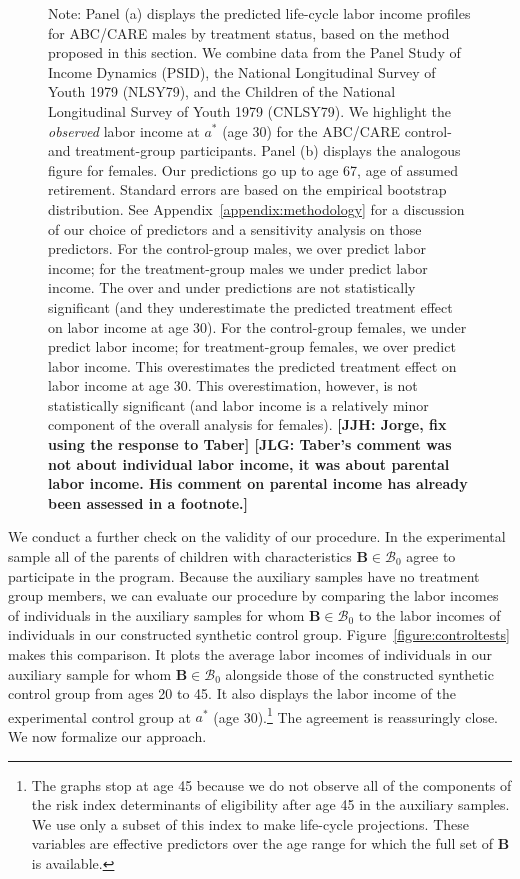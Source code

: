 \begin{figure}
Note: Panel (a) displays the predicted life-cycle labor income profiles for ABC/CARE males by treatment status, based on the method proposed in this section. We combine data from the Panel Study of Income Dynamics (PSID), the National Longitudinal Survey of Youth 1979 (NLSY79), and the Children of the National Longitudinal Survey of Youth 1979 (CNLSY79). We highlight the \textit{observed} labor income at $a^*$ (age 30) for the ABC/CARE control- and treatment-group participants. Panel (b) displays the analogous figure for females. Our predictions go up to age 67, age of assumed retirement. Standard errors are based on the empirical bootstrap distribution. See  Appendix~\ref{appendix:methodology} for a discussion of our choice of predictors and a sensitivity analysis on those predictors. For the control-group males, we over predict labor income; for the treatment-group males we under predict labor income. The over and under predictions are not statistically significant (and they underestimate the predicted treatment effect on labor income at age 30). For the control-group females, we under predict labor income; for treatment-group females, we over predict labor income. This overestimates the predicted treatment effect on labor income at age 30. This overestimation, however, is not statistically significant (and labor income is a relatively minor component of the overall analysis for females). \textbf{[JJH: Jorge, fix using the response to Taber] [JLG: Taber's comment was not about individual labor income, it was about parental labor income. His comment on parental income has already been assessed in a footnote.] }
\end{figure}

We conduct a further check on the validity of our procedure. In the experimental sample all of the parents of children with characteristics $\bm{B} \in \mathcal{B}_0$ agree to participate in the program.  Because the auxiliary samples have no treatment group members, we can evaluate our procedure by comparing the labor incomes of individuals in the auxiliary samples for whom $\bm{B} \in \mathcal{B}_0$ to the labor incomes of individuals in our constructed synthetic control group. Figure~\ref{figure:controltests} makes this comparison. It plots the average labor incomes of individuals in our auxiliary sample for whom $\bm{B} \in \mathcal{B}_0$ alongside those of the constructed synthetic control group from ages 20 to 45. It also displays the labor income of the experimental control group at $a^*$ (age 30).\footnote{The graphs stop at age 45 because we do not observe all of the components of the risk index determinants of eligibility after age 45 in the auxiliary samples. We use only a subset of this index to make life-cycle projections. These variables are effective predictors over the age range for which the full set of $\bm{B}$ is available.} The agreement is reassuringly close. We now formalize our approach.

